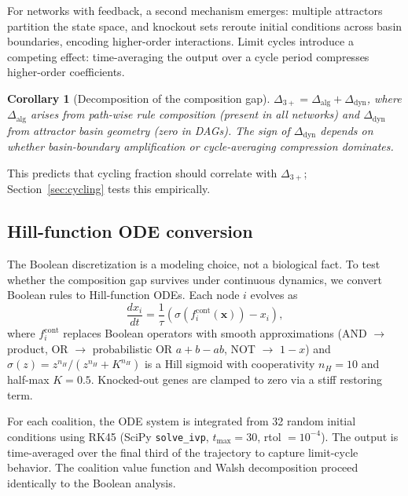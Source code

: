 \documentclass[10pt]{article}
\newtheorem{corollary}[proposition]{Corollary}
\begin{document}
For networks with feedback, a second mechanism emerges: multiple
attractors partition the state space, and knockout sets reroute
initial conditions across basin boundaries, encoding higher-order
interactions. Limit cycles introduce a competing effect:
time-averaging the output over a cycle period compresses higher-order
coefficients.

\begin{corollary}[Decomposition of the composition gap]
\label{cor:decomposition}
$\Delta_{3+} = \Delta_{\mathrm{alg}} + \Delta_{\mathrm{dyn}}$,
where $\Delta_{\mathrm{alg}}$ arises from path-wise rule composition
(present in all networks) and $\Delta_{\mathrm{dyn}}$ from attractor
basin geometry (zero in DAGs). The sign of
$\Delta_{\mathrm{dyn}}$ depends on whether basin-boundary
amplification or cycle-averaging compression dominates.
\end{corollary}

This predicts that cycling fraction should correlate with
$\Delta_{3+}$; Section~\ref{sec:cycling} tests this empirically.


\subsection{Hill-function ODE conversion}
\label{sec:ode-method}

The Boolean discretization is a modeling choice, not a biological
fact. To test whether the composition gap survives under continuous
dynamics, we convert Boolean rules to Hill-function ODEs. Each node
$i$ evolves as
\begin{equation}
  \frac{dx_i}{dt} = \frac{1}{\tau}
  \left( \sigma\!\left(f_i^{\mathrm{cont}}(\mathbf{x})\right) - x_i \right),
\end{equation}
where $f_i^{\mathrm{cont}}$ replaces Boolean operators with smooth
approximations (AND $\to$ product, OR $\to$ probabilistic OR
$a + b - ab$, NOT $\to$ $1 - x$) and $\sigma(z) = z^{n_H} / (z^{n_H} + K^{n_H})$
is a Hill sigmoid with cooperativity $n_H = 10$ and half-max $K = 0.5$.
Knocked-out genes are clamped to zero via a stiff restoring term.

For each coalition, the ODE system is integrated from 32 random
initial conditions using RK45 (SciPy \texttt{solve\_ivp},
$t_{\max} = 30$, rtol $= 10^{-4}$). The output is time-averaged
over the final third of the trajectory to capture limit-cycle
behavior. The coalition value function and Walsh decomposition
proceed identically to the Boolean analysis.
\end{document}
